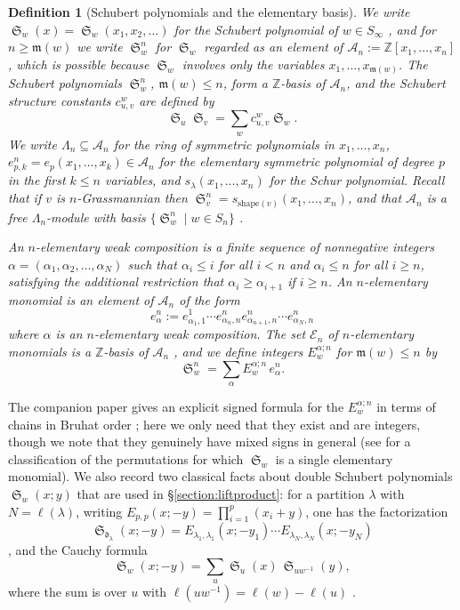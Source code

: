 \documentclass[pdflatex,sn-mathphys-num]{sn-jnl}
\numberwithin{equation}{subsection}
\DeclareMathOperator{\sch}{\mathfrak{S}}
\newcommand{\coma}{\mathcal{A}}
\newcommand{\dom}{\mathfrak{d}}
\newcommand{\maxd}{\mathfrak{m}}
\theoremstyle{thmstyleone}
\theoremstyle{thmstylethree}
\newtheorem{definition}[lemma]{Definition}
\theoremstyle{thmstyletwo}
\begin{document}
\begin{definition}[Schubert polynomials and the elementary basis]\label{definition:schubert}
We write $\sch_w(x)=\sch_w(x_1,x_2,\ldots)$ for the Schubert polynomial of $w\in S_\infty$ \cite{notes}, and for $n\geq\maxd(w)$ we write $\sch_w^n$ for $\sch_w$ regarded as an element of $\coma_n := \mathbb{Z}[x_1,\ldots,x_n]$, which is possible because $\sch_w$ involves only the variables $x_1,\ldots,x_{\maxd(w)}$. The Schubert polynomials $\sch_w^n$, $\maxd(w)\leq n$, form a $\mathbb{Z}$-basis of $\coma_n$, and the Schubert structure constants $c_{u,v}^w$ are defined by
$$\sch_u\sch_v = \sum_w c_{u,v}^w\sch_w.$$
We write $\Lambda_n\subseteq\coma_n$ for the ring of symmetric polynomials in $x_1,\ldots,x_n$, $e_{p,k}^n=e_p(x_1,\ldots,x_k)\in\coma_n$ for the elementary symmetric polynomial of degree $p$ in the first $k\leq n$ variables, and $s_\lambda(x_1,\ldots,x_n)$ for the Schur polynomial. Recall that if $v$ is $n$-Grassmannian then $\sch_v^n = s_{\mathrm{shape}(v)}(x_1,\ldots,x_n)$, and that $\coma_n$ is a free $\Lambda_n$-module with basis $\{\sch_w^n\mid w\in S_n\}$ \cite{notes}.

An \emph{$n$-elementary weak composition} is a finite sequence of nonnegative integers $\alpha=(\alpha_1,\alpha_2,\ldots,\alpha_N)$ such that $\alpha_i\leq i$ for all $i<n$ and $\alpha_i\leq n$  for all $i\geq n$, satisfying the additional restriction that $\alpha_i\geq \alpha_{i+1}$ if $i\geq n$. An \emph{$n$-elementary monomial} is an element of $\coma_n$ of the form 
$$e_\alpha^n := e_{\alpha_1,1}^{1}\cdots e_{\alpha_n,n}^ne_{\alpha_{n+1},n}^n\cdots e_{\alpha_N,n}^n$$
where $\alpha$ is an $n$-elementary weak composition. The set $\mathcal{E}_n$ of $n$-elementary monomials is a $\mathbb{Z}$-basis of $\coma_n$ \cite[\S\ref*{B-section:elementary}]{samuelbialgebra}, and we define integers $E_w^{\alpha;n}$ for $\maxd(w)\leq n$ by
$$\sch_w^n = \sum_\alpha E_w^{\alpha;n}\,e_\alpha^n.$$
\end{definition}

The companion paper gives an explicit signed formula for the $E_w^{\alpha;n}$ in terms of chains in Bruhat order \cite[Theorem~\ref*{B-theorem:elemtrans}]{samuelbialgebra}; here we only need that they exist and are integers, though we note that they genuinely have mixed signs in general (see \cite{woodruff2025single} for a classification of the permutations for which $\sch_w$ is a single elementary monomial). We also record two classical facts about double Schubert polynomials $\sch_w(x;y)$ that are used in \S\ref{section:liftproduct}: for a partition $\lambda$ with $N=\ell(\lambda)$, writing $E_{p,p}(x;-y)=\prod_{i=1}^p(x_i+y)$, one has the factorization
$$\sch_{\dom_\lambda}(x;-y) = E_{\lambda_1,\lambda_1}(x;-y_1)\cdots E_{\lambda_N,\lambda_N}(x;-y_N)$$
\cite[(6.14)]{notes}, and the Cauchy formula
$$\sch_w(x;-y) = \sum_{u} \sch_u(x)\,\sch_{uw^{-1}}(y),$$
where the sum is over $u$ with $\ell(uw^{-1})=\ell(w)-\ell(u)$ \cite{notes}.
\end{document}
